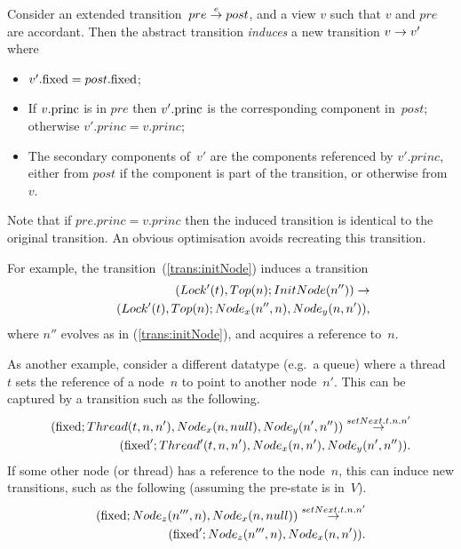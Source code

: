 \begin{definition}
\label{def:induced-transition}
Consider an extended transition~$pre \stackrel{e}\rightarrow post$, and a view $v$ such that
$v$ and $pre$ are accordant.  Then the abstract transition \emph{induces} a
new transition $v \stackrel{}\rightarrow v'$ where
\begin{itemize}
\item $v'.\mathrm{fixed} = post.\mathrm{fixed}$;

\item If $v.\mathrm{princ}$ is in $pre$ then $v'.\mathrm{princ}$ is the corresponding
  component in~$post$; otherwise $v'.princ = v.princ$;

\item The secondary components of~$v'$ are the components referenced by
  $v'.princ$, either from $post$ if the component is part of the transition,
  or otherwise from~$v$.
\end{itemize}
\end{definition}

Note that if $pre.princ = v.princ$ then the induced transition is identical to
the original transition.  An obvious optimisation avoids recreating this
transition. 

For example, the  transition~(\ref{trans:initNode}) induces a transition
\[
\begin{align}
(Lock'(t), Top(n); InitNode(n'')) \stackrel{}\rightarrow \\
\qquad  (Lock'(t), Top(n); Node_x(n'', n), Node_y(n, n')),
\end{align}
\]
where $n''$ evolves as in (\ref{trans:initNode}), and acquires a reference
to~$n$. 

As another example, consider a different datatype (e.g.~a queue) where a
thread~$t$ sets the  reference of a node~$n$ to point to another
node~$n'$.  This can be captured by a transition such as the following.
\[
\begin{align}
(\mathrm{fixed}; Thread(t, n, n'), Node_x(n, null), Node_y(n', n'')) 
  \stackrel{setNext.t.n.n'}\rightarrow \\
\qquad (\mathrm{fixed}'; Thread'(t, n, n'), Node_x(n, n'), Node_y(n', n'')).
\end{align}
\]
If some other node (or thread) has a reference to the node~$n$, this can
induce new transitions, such as the following (assuming the pre-state is
in~$V$). 
\[
\begin{align}
(\mathrm{fixed}; Node_z(n''', n), Node_x(n, null))  \stackrel{setNext.t.n.n'}\rightarrow \\
\qquad  (\mathrm{fixed}'; Node_z(n''', n), Node_x(n, n')).
\end{align}
\]


